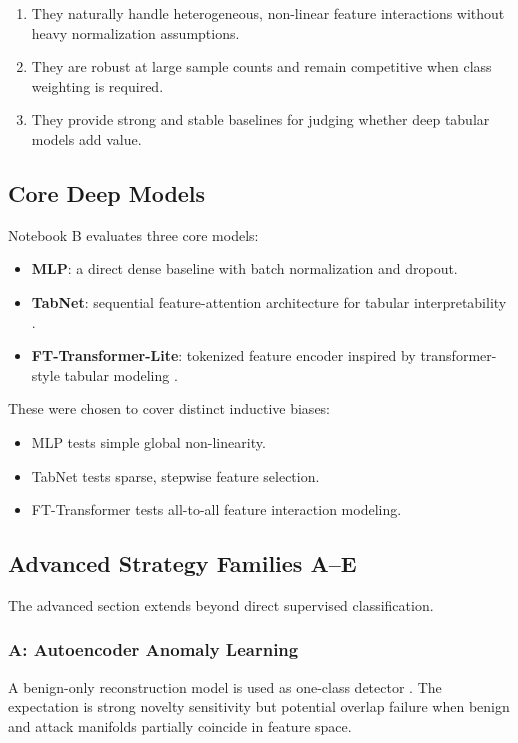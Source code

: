 \documentclass[10pt,journal]{IEEEtran}
\begin{document}
\begin{enumerate}
\item They naturally handle heterogeneous, non-linear feature interactions without heavy normalization assumptions.
\item They are robust at large sample counts and remain competitive when class weighting is required.
\item They provide strong and stable baselines for judging whether deep tabular models add value.
\end{enumerate}

\subsection{Core Deep Models}
Notebook B evaluates three core models:

\begin{itemize}
\item \textbf{MLP}: a direct dense baseline with batch normalization and dropout.
\item \textbf{TabNet}: sequential feature-attention architecture for tabular interpretability \cite{arik2021tabnet}.
\item \textbf{FT-Transformer-Lite}: tokenized feature encoder inspired by transformer-style tabular modeling \cite{gorishniy2021revisiting}.
\end{itemize}

These were chosen to cover distinct inductive biases:

\begin{itemize}
\item MLP tests simple global non-linearity.
\item TabNet tests sparse, stepwise feature selection.
\item FT-Transformer tests all-to-all feature interaction modeling.
\end{itemize}

\subsection{Advanced Strategy Families A--E}
The advanced section extends beyond direct supervised classification.

\subsubsection{A: Autoencoder Anomaly Learning}
A benign-only reconstruction model is used as one-class detector \cite{hinton2006reducing}. The expectation is strong novelty sensitivity but potential overlap failure when benign and attack manifolds partially coincide in feature space.
\end{document}
